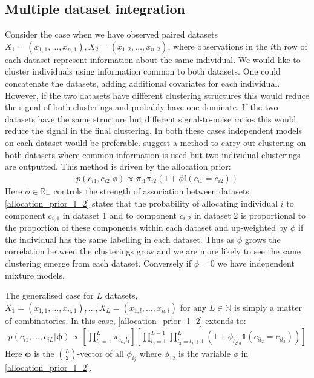 \documentclass[12pt]{article} %
\begin{document}
	\subsection{Multiple dataset integration}
	Consider the case when we have observed paired datasets $X_1 = (x_{1,1},\ldots,x_{n,1}), X_2 = (x_{1,2},\ldots,x_{n,2})$, where observations in the $i$th row of each dataset represent information about the same individual. We would like to cluster individuals using information common to both datasets. One could concatenate the datasets, adding additional covariates for each individual. However, if the two datasets have different clustering structures this would reduce the signal of both clusterings and probably have one dominate. If the two datasets have the same structure but different signal-to-noise ratios this would reduce the signal in the final clustering. In both these cases independent models on each dataset would be preferable. \citet{KirkBayesiancorrelatedclustering2012} suggest a method to carry out clustering on both datasets where common information is used but two individual clusterings are outputted. This method is driven by the allocation prior:
	\begin{align} \label{allocation_prior_l_2}
	p(c_{i1}, c_{i2} | \phi ) \propto \pi_{i1} \pi_{i2} (1 + \phi \mathbb{I}(c_{i1} = c_{i2}))
	\end{align}
	Here $\phi \in \mathbb{R}_+$ controls the strength of association between datasets. \eqref{allocation_prior_l_2} states that the probability of allocating individual $i$ to component $c_{i,1}$ in dataset 1 and to component $c_{i,2}$ in dataset 2 is proportional to the proportion of these components within each dataset and up-weighted by $\phi$ if the individual has the same labelling in each dataset. Thus as $\phi$ grows the correlation between the clusterings grow and we are more likely to see the same clustering emerge from each dataset. Conversely if $\phi = 0$ we have independent mixture models. 
	
	The generalised case for $L$ datasets, $X_1 = (x_{1,1},\ldots,x_{n,1}),\ldots, X_L = (x_{1,l},\ldots,x_{n,l})$ for any $L \in \mathbb{N}$ is simply a matter of combinatorics. In this case, \eqref{allocation_prior_l_2} extends to:
	\begin{align} \label{allocation_prior}
	p(c_{i1},\ldots,c_{iL} | \boldsymbol{\phi}) \propto \left[\prod_{l_1=1}^L\pi_{c_{il_1}l_1} \right]\left[\prod_{l_2=1}^{L-1}\prod_{l_3=l_2+1}^L\left(1+\phi_{l_2l_3}\mathbb{1}(c_{il_2} = c_{il_3}) \right)\right]
	\end{align}
	Here $\boldsymbol{\phi}$ is the ${L \choose 2}$-vector of all $\phi_{ij}$ where $\phi_{12}$ is the variable $\phi$ in \eqref{allocation_prior_l_2}.
	
\end{document}
